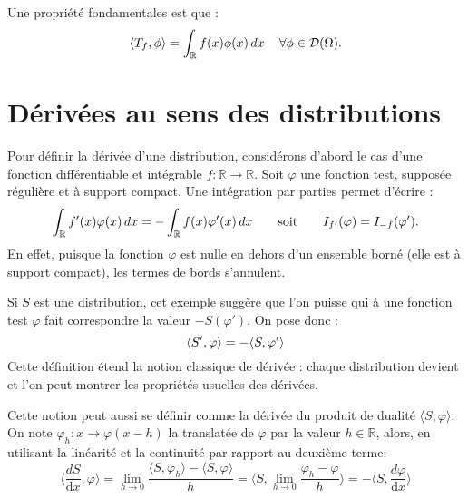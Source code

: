 \medskip
Une propriété fondamentales est que  :
\begin{equation}
    \langle T_f,\phi\rangle=\int_{\mathbb{R}}f(x)\phi(x)\,\mathrm \mathrm dx \, \quad \forall \phi\in\mathcal{D}(\Omega).
\end{equation}




\medskip
\section{Dérivées au sens des distributions}


\medskip
Pour définir la dérivée d'une distribution, considérons d'abord le cas d'une fonction différentiable
et intégrable $f:\mathbb{R}\rightarrow\mathbb{R}$.
Soit $\varphi$ une fonction test, supposée régulière et à support compact.
Une intégration par parties permet d'écrire :
\begin{equation}
    \int_{\mathbb R} f'(x) \varphi(x)\,\mathrm \mathrm dx = -\int_{\mathbb R} f(x)\varphi'(x)\,\mathrm \mathrm dx \qquad\mathrm{soit}\qquad I_{f'}(\varphi)=I_{-f}(\varphi').
\end{equation}
En effet, puisque la fonction $\varphi$ est nulle en dehors d'un ensemble borné (elle est à support
compact), les termes de bords s'annulent.

\medskip
\begin{definition}
Si $S$ est une distribution, cet exemple suggère que l'on puisse  qui à une fonction test $\varphi$ fait correspondre la valeur $- S(\varphi')$.
On pose donc :
\begin{equation}\colorred
    \langle S', \varphi \rangle = - \langle S, \varphi' \rangle
\end{equation}
Cette définition étend la notion classique de dérivée :
chaque distribution devient  et l'on peut montrer les
propriétés usuelles des dérivées.
\end{definition}

\medskip
Cette notion peut aussi se définir comme la dérivée du produit de dualité $\langle S,\varphi\rangle$.
On note $\varphi_h:x\rightarrow\varphi(x-h)$ la translatée de $\varphi$ par la valeur $h\in{\mathbb R}$,
alors, en utilisant la linéarité et la continuité par rapport au deuxième terme:
\begin{equation}
\langle\frac{dS}{\mathrm dx},\varphi\rangle= \lim_{h\rightarrow 0}\frac{ \langle S,\varphi_h\rangle- \langle S,\varphi\rangle}{h}
= \langle S,\lim_{h\rightarrow 0} \frac{\varphi_h-\varphi}{h} \rangle= -\langle S,\frac{d\varphi}{\mathrm dx}\rangle
\end{equation}

